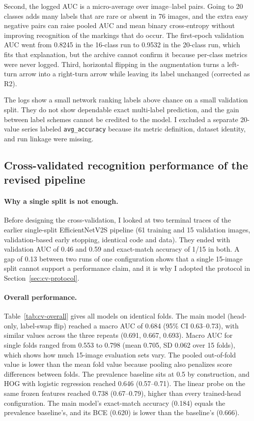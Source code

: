 \documentclass[11pt]{article}
\begin{document}
Second, the logged AUC is a micro-average over image--label pairs. Going to 20 classes adds many labels that are rare or absent in 76 images, and the extra easy negative pairs can raise pooled AUC and mean binary cross-entropy without improving recognition of the markings that do occur. The first-epoch validation AUC went from 0.8245 in the 16-class run to 0.9532 in the 20-class run, which fits that explanation, but the archive cannot confirm it because per-class metrics were never logged. Third, horizontal flipping in the augmentation turns a left-turn arrow into a right-turn arrow while leaving its label unchanged (corrected as R2).

The logs show a small network ranking labels above chance on a small validation split. They do not show dependable exact multi-label prediction, and the gain between label schemes cannot be credited to the model. I excluded a separate 20-value series labeled \texttt{avg\_accuracy} because its metric definition, dataset identity, and run linkage were missing.

\subsection{Cross-validated recognition performance of the revised pipeline}
\label{sec:cv-results}
\paragraph{Why a single split is not enough.} Before designing the cross-validation, I looked at two terminal traces of the earlier single-split EfficientNetV2S pipeline (61 training and 15 validation images, validation-based early stopping, identical code and data). They ended with validation AUC of 0.46 and 0.59 and exact-match accuracy of 1/15 in both. A gap of 0.13 between two runs of one configuration shows that a single 15-image split cannot support a performance claim, and it is why I adopted the protocol in Section~\ref{sec:cv-protocol}.

\paragraph{Overall performance.} Table~\ref{tab:cv-overall} gives all models on identical folds. The main model (head-only, label-swap flip) reached a macro AUC of 0.684 (95\% CI 0.63--0.73), with similar values across the three repeats (0.691, 0.667, 0.693). Macro AUC for single folds ranged from 0.553 to 0.798 (mean 0.705, SD 0.062 over 15 folds), which shows how much 15-image evaluation sets vary. The pooled out-of-fold value is lower than the mean fold value because pooling also penalizes score differences between folds. The prevalence baseline sits at 0.5 by construction, and HOG with logistic regression reached 0.646 (0.57--0.71). The linear probe on the same frozen features reached 0.738 (0.67--0.79), higher than every trained-head configuration. The main model's exact-match accuracy (0.184) equals the prevalence baseline's, and its BCE (0.620) is lower than the baseline's (0.666).
\end{document}
